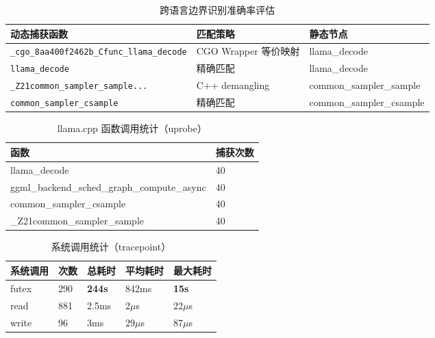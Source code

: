\documentclass[12pt,a4paper]{ctexbook}
\begin{document}
\begin{table}[htbp]
\centering
\caption{跨语言边界识别准确率评估}
\label{tab:cross_language_accuracy}
\begin{tabular}{|p{6cm}|p{4cm}|p{4cm}|}
\hline
\textbf{动态捕获函数} & \textbf{匹配策略} & \textbf{静态节点} \\
\hline
\texttt{\_cgo\_8aa400f2462b\_Cfunc\_llama\_decode} & CGO Wrapper 等价映射 & llama\_decode \\
\hline
\texttt{llama\_decode} & 精确匹配 & llama\_decode \\
\hline
\texttt{\_Z21common\_sampler\_sample...} & C++ demangling & common\_sampler\_sample \\
\hline
\texttt{common\_sampler\_csample} & 精确匹配 & common\_sampler\_csample \\
\hline
\end{tabular}
\end{table}
\newpage

\begin{table}[htbp]
\centering
\caption{llama.cpp 函数调用统计（uprobe）}
\label{tab:uprobe_stats}
\begin{tabular}{|p{6cm}|p{4cm}|}
\hline
\textbf{函数} & \textbf{捕获次数} \\
\hline
llama\_decode & 40 \\
\hline
ggml\_backend\_sched\_graph\_compute\_async & 40 \\
\hline
common\_sampler\_csample & 40 \\
\hline
\_Z21common\_sampler\_sample & 40 \\
\hline
\end{tabular}
\end{table}
\newpage

\begin{table}[htbp]
\centering
\caption{系统调用统计（tracepoint）}
\label{tab:syscall_stats}
\begin{tabular}{|p{2.5cm}|p{2cm}|p{2.5cm}|p{2.5cm}|p{2.5cm}|}
\hline
\textbf{系统调用} & \textbf{次数} & \textbf{总耗时} & \textbf{平均耗时} & \textbf{最大耗时} \\
\hline
futex & 290 & \textbf{244s} & 842ms & \textbf{15s} \\
\hline
read & 881 & 2.5ms & 2$\mu$s & 22$\mu$s \\
\hline
write & 96 & 3ms & 29$\mu$s & 87$\mu$s \\
\hline
\end{tabular}
\end{table}
\newpage
\end{document}
